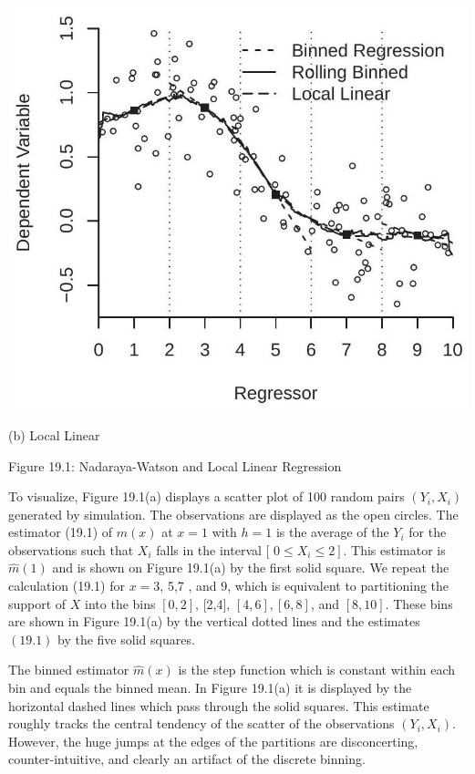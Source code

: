 \documentclass[10pt]{article}
\begin{document}
\includegraphics[max width=\textwidth]{2022_10_23_027876b875523fa3ea56g-02(1)}

(b) Local Linear

Figure 19.1: Nadaraya-Watson and Local Linear Regression

To visualize, Figure 19.1(a) displays a scatter plot of 100 random pairs $\left(Y_{i}, X_{i}\right)$ generated by simulation. The observations are displayed as the open circles. The estimator (19.1) of $m(x)$ at $x=1$ with $h=1$ is the average of the $Y_{i}$ for the observations such that $X_{i}$ falls in the interval [ $\left.0 \leq X_{i} \leq 2\right]$. This estimator is $\widehat{m}(1)$ and is shown on Figure 19.1(a) by the first solid square. We repeat the calculation (19.1) for $x=3$, 5,7 , and 9, which is equivalent to partitioning the support of $X$ into the bins $[0,2]$, [2,4], $[4,6],[6,8]$, and $[8,10]$. These bins are shown in Figure 19.1(a) by the vertical dotted lines and the estimates $(19.1)$ by the five solid squares.

The binned estimator $\widehat{m}(x)$ is the step function which is constant within each bin and equals the binned mean. In Figure 19.1(a) it is displayed by the horizontal dashed lines which pass through the solid squares. This estimate roughly tracks the central tendency of the scatter of the observations $\left(Y_{i}, X_{i}\right)$. However, the huge jumps at the edges of the partitions are disconcerting, counter-intuitive, and clearly an artifact of the discrete binning.
\end{document}
